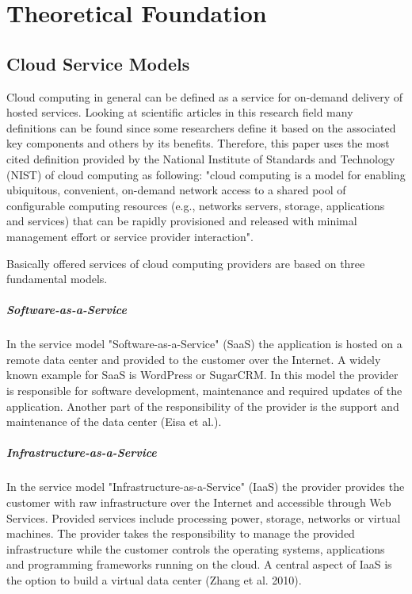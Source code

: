 %
%
%
\chapter{Theoretical Foundation}
\label{chap:theoretical}

%
%
%
\section{Cloud Service Models}
Cloud computing in general can be defined as a service for on-demand delivery
of hosted services. Looking at scientific articles in this research field many definitions can be found since some researchers define it based on the associated key components and others by its benefits. Therefore, this paper uses the most cited definition provided by the National Institute of Standards and Technology (NIST) of cloud computing as following: "cloud computing is a model for enabling ubiquitous, convenient, on-demand network access to a shared pool of
configurable computing resources (e.g., networks servers, storage, applications
and services) that can be rapidly provisioned and released with minimal management effort or service provider interaction".

Basically offered services of cloud computing providers are based on three fundamental models.
\paragraph{Software-as-a-Service}
In the service model "Software-as-a-Service" (SaaS) the application is hosted on a remote data center and provided to the customer over the Internet. A widely
known example for SaaS is WordPress or SugarCRM. In this model the provider
is responsible for software development, maintenance and required updates of
the application. Another part of the responsibility of the provider is the support
and maintenance of the data center (Eisa et al.).
\paragraph{Infrastructure-as-a-Service}
In the service model "Infrastructure-as-a-Service" (IaaS) the provider provides the customer with raw infrastructure over the Internet and accessible through
Web Services. Provided services include processing power, storage, networks or
virtual machines. The provider takes the responsibility to manage the provided
infrastructure while the customer controls the operating systems, applications
and programming frameworks running on the cloud. A central aspect of IaaS is
the option to build a virtual data center (Zhang et al. 2010).

